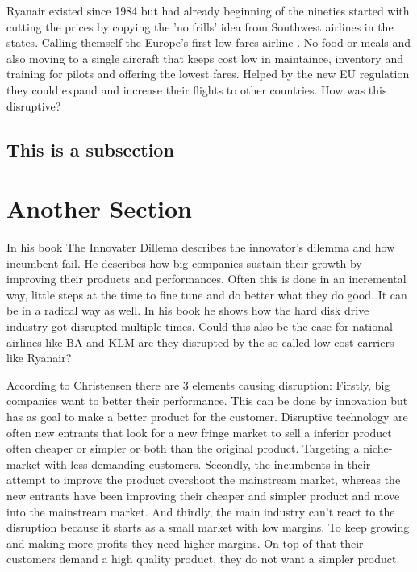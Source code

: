 \documentclass[a4paper, 11pt]{article}
\begin{document}
Ryanair existed since 1984 but had already beginning of the nineties started with cutting the prices by copying the 'no frills' idea from Southwest airlines in the states. Calling themself the Europe’s first low fares airline \cite{Ryanair}. No food or meals and also moving to a single aircraft that keeps cost low in maintaince, inventory and training for pilots and offering the lowest fares. Helped by the new EU regulation they could expand and increase their flights to other countries. How was this disruptive?

\subsection{This is a subsection}
\label{sec:this-is-a-section}

\section{Another Section}


In his book The Innovater Dillema \cite{Christensen97} describes the innovator's dilemma and how incumbent fail. He describes how big companies sustain their growth by improving their products and performances. Often this is done in an incremental way, little steps at the time to fine tune and do better what they do good. It can be in a radical way as well. In his book he shows how the hard disk drive industry got disrupted multiple times. Could this also be the case for national airlines like BA and KLM are they disrupted by the so called low cost carriers like Ryanair?

According to Christensen \cite{Christensen97} there are 3 elements causing disruption:
Firstly, big companies want to better their performance. This can be done by innovation but has as goal to make a better product for the customer. Disruptive technology are often new entrants that look for a new fringe market to sell a inferior product often cheaper or simpler or both than the original product. Targeting a niche-market with less demanding customers. Secondly, the incumbents in their attempt to improve the product overshoot the mainstream market, whereas the new entrants have been improving their cheaper and simpler product and move into the mainstream market.
And thirdly, the main industry can't react to the disruption because it starts as a small market with low margins. To keep growing and making more profits they need higher margins. On top of that their customers demand a high quality product, they do not want a simpler product.
\end{document}
